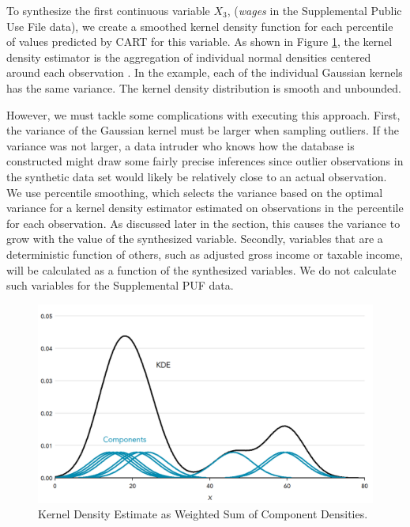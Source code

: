 \documentclass[11pt,runningheads,oribibl]{llncs}
\begin{document}
To synthesize the first continuous variable $X_3$, (\textit{wages} in the Supplemental Public Use File data), we create a smoothed kernel density function for each percentile of values predicted by CART for this variable. As shown in Figure \ref{fig:kde}, the kernel density estimator is the aggregation of individual normal densities centered around each observation \citep{wicklin2016visualize}. In the example, each of the individual Gaussian kernels has the same variance. The kernel density distribution is smooth and unbounded. 

However, we must tackle some complications with executing this approach. First, the variance of the Gaussian kernel must be larger when sampling outliers. If the variance was not larger, a data intruder who knows how the database is constructed might draw some fairly precise inferences since outlier observations in the synthetic data set would likely be relatively close to an actual observation. We use percentile smoothing, which selects the variance based on the optimal variance for a kernel density estimator estimated on observations in the percentile for each observation. As discussed later in the section, this causes the variance to grow with the value of the synthesized variable. Secondly, variables that are a deterministic function of others, such as adjusted gross income or taxable income, will be calculated as a function of the synthesized variables. We do not calculate such variables for the Supplemental PUF data.

\begin{figure}
    \includegraphics[width=\textwidth]{figures/kde-1.png}
    \caption{Kernel Density Estimate as Weighted Sum of Component Densities.} \label{fig:kde}
\end{figure}
\end{document}
